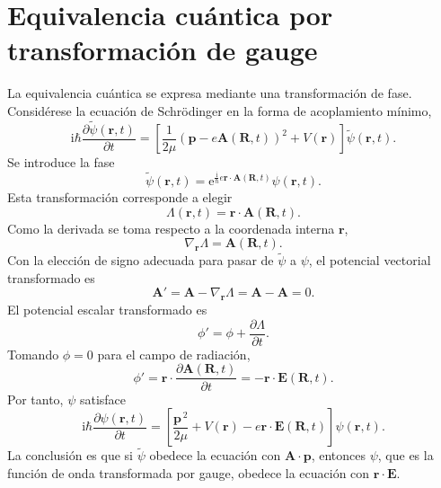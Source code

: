 \documentclass[11pt]{article}
\newcommand{\ii}{\mathrm{i}}
\newcommand{\ee}{\mathrm{e}}
\newcommand{\vb}[1]{\mathbf{#1}}
\begin{document}
\section{Equivalencia cu\'antica por transformaci\'on de gauge}

La equivalencia cu\'antica se expresa mediante una transformaci\'on de fase.
Consid\'erese la ecuaci\'on de Schr\"odinger en la forma de acoplamiento
m\'inimo,
\begin{equation}
  \ii\hbar\frac{\partial\tilde\psi(\vb r,t)}{\partial t}
  =
  \left[
    \frac{1}{2\mu}
    \left(
      \vb p-e\vb A(\vb R,t)
    \right)^2
    +
    V(\vb r)
  \right]\tilde\psi(\vb r,t).
\end{equation}
Se introduce la fase
\begin{equation}
  \tilde\psi(\vb r,t)
  =
  \ee^{\frac{\ii}{\hbar}e\vb r\cdot\vb A(\vb R,t)}
  \psi(\vb r,t).
\end{equation}
Esta transformaci\'on corresponde a elegir
\begin{equation}
  \Lambda(\vb r,t)
  =
  \vb r\cdot\vb A(\vb R,t).
\end{equation}
Como la derivada se toma respecto a la coordenada interna \(\vb r\),
\begin{equation}
  \nabla_{\vb r}\Lambda
  =
  \vb A(\vb R,t).
\end{equation}
Con la elecci\'on de signo adecuada para pasar de \(\tilde\psi\) a \(\psi\),
el potencial vectorial transformado es
\begin{equation}
  \vb A'
  =
  \vb A-\nabla_{\vb r}\Lambda
  =
  \vb A-\vb A
  =
  0.
\end{equation}
El potencial escalar transformado es
\begin{equation}
  \phi'
  =
  \phi+\frac{\partial\Lambda}{\partial t}.
\end{equation}
Tomando \(\phi=0\) para el campo de radiaci\'on,
\begin{equation}
  \phi'
  =
  \vb r\cdot
  \frac{\partial\vb A(\vb R,t)}{\partial t}
  =
  -\vb r\cdot\vb E(\vb R,t).
\end{equation}
Por tanto, \(\psi\) satisface
\begin{equation}
  \ii\hbar\frac{\partial\psi(\vb r,t)}{\partial t}
  =
  \left[
    \frac{\vb p^{\,2}}{2\mu}
    +
    V(\vb r)
    -
    e\vb r\cdot\vb E(\vb R,t)
  \right]\psi(\vb r,t).
\end{equation}
La conclusi\'on es que si \(\tilde\psi\) obedece la ecuaci\'on con
\(\vb A\cdot\vb p\), entonces \(\psi\), que es la funci\'on de onda
transformada por gauge, obedece la ecuaci\'on con \(\vb r\cdot\vb E\).
\end{document}
